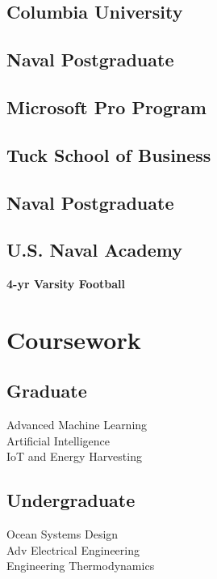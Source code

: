 \documentclass[]{Forester-Resume}
\begin{document}
\begin{minipage}[t]{0.33\textwidth}
\subsection{Columbia University}

\sectionsep
\subsection{Naval Postgraduate}

\sectionsep
\subsection{Microsoft Pro Program}

\sectionsep 
\subsection{Tuck School of Business}

\sectionsep
\subsection{Naval Postgraduate}

\sectionsep
\subsection{U.S. Naval Academy}
\textbf{4-yr Varsity Football}

\sectionsep
\section{Coursework}
\subsection{Graduate}
Advanced Machine Learning \\
Artificial Intelligence \\
IoT and Energy Harvesting\\
\subsection{Undergraduate}
Ocean Systems Design \\
Adv Electrical Engineering\\
Engineering Thermodynamics \\

%
%

\end{minipage} 
\end{document}
